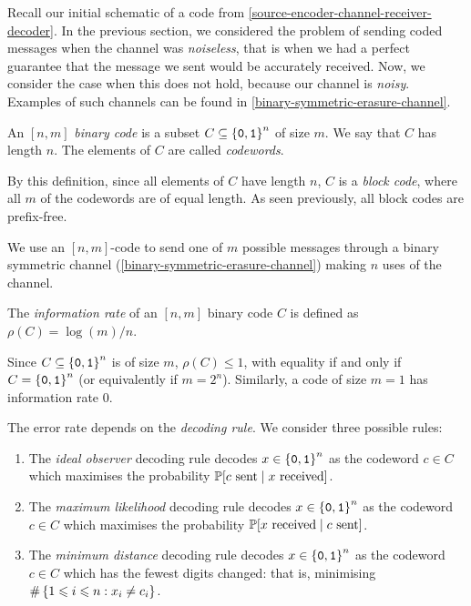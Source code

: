 \documentclass{article}
\begin{document}
Recall our initial schematic of a code from \ref{source-encoder-channel-receiver-decoder}. In the previous section, we considered the problem of sending coded messages when the channel was \textit{noiseless}, that is when we had a perfect guarantee that the message we sent would be accurately received. Now, we consider the case when this does not hold, because our channel is \textit{noisy}. Examples of such channels can be found in \ref{binary-symmetric-erasure-channel}.

\begin{definition}
    An $[n, m]$ \textit{binary code} is a subset $C \subs \set{\texttt{0}, \texttt{1}}^n$ of size $m$. We say that $C$ has length $n$. The elements of $C$ are called \textit{codewords}.
\end{definition}

\begin{note}
	By this definition, since all elements of $C$ have length $n$, $C$ is a \textit{block code}, where all $m$ of the codewords are of equal length. As seen previously, all block codes are prefix-free.
\end{note}

We use an $[n, m]$-code to send one of $m$ possible messages through a binary symmetric channel (\ref{binary-symmetric-erasure-channel}) making $n$ uses of the channel.

\begin{definition}
	\label{information-rate}
    The \textit{information rate} of an $[n, m]$ binary code $C$ is defined as $\rho(C) = \log(m)/n$.
\end{definition}

\begin{corollary}
    Since $C \subs \set{\texttt{0}, \texttt{1}}^n$ is of size $m$, $\rho(C) \leq 1$, with equality if and only if $C = \set{\texttt{0}, \texttt{1}}^n$ (or equivalently if $m = 2^n$). Similarly, a code of size $m=1$ has information rate 0. 
\end{corollary}

The error rate depends on the \textit{decoding rule}. We consider three possible rules:
\begin{enumerate}
    \item The \textit{ideal observer} decoding rule decodes $x \in \set{\texttt{0}, \texttt{1}}^n$ as the codeword $c \in C$ which maximises the probability $\P[c \text{ sent} \mid x \text{ received}]$.
    \item The \textit{maximum likelihood} decoding rule decodes $x \in \set{\texttt{0}, \texttt{1}}^n$ as the codeword $c \in C$ which maximises the probability $\P[x \text{ received} \mid c \text{ sent}]$.
    \item The \textit{minimum distance} decoding rule decodes $x \in \set{\texttt{0}, \texttt{1}}^n$ as the codeword $c \in C$ which has the fewest digits changed: that is, minimising $\#\set{1 \leq i \leq n : x_i \neq c_i}$.
\end{enumerate}
\end{document}
